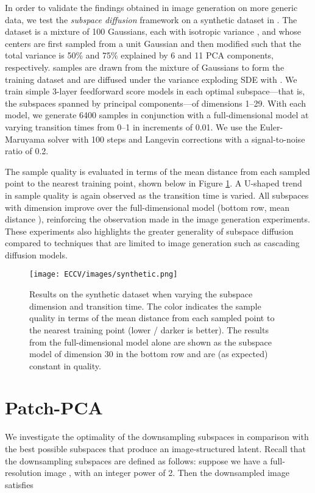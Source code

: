 \documentclass{article}
\begin{document}
In order to validate the findings obtained in image generation on more generic data, we test the \textit{subspace diffusion} framework on a synthetic dataset in . The dataset is a mixture of 100 Gaussians, each with isotropic variance , and whose centers are first sampled from a unit Gaussian and then modified such that the total variance is 50\% and 75\% explained by 6 and 11 PCA components, respectively.  samples are drawn from the mixture of Gaussians to form the training dataset and are diffused under the variance exploding SDE with . We train simple 3-layer feedforward score models in each optimal subspace---that is, the subspaces spanned by principal components---of dimensions 1--29. With each model, we generate 6400 samples in conjunction with a full-dimensional model at varying transition times from 0--1 in increments of 0.01. We use the Euler-Maruyama solver with 100 steps and Langevin corrections with a signal-to-noise ratio of 0.2.

The sample quality is evaluated in terms of the mean  distance from each sampled point to the nearest training point, shown below in Figure \ref{fig:synthetic}. A U-shaped trend in sample quality is again observed as the transition time is varied. All subspaces with dimension  improve over the full-dimensional model (bottom row, mean distance ), reinforcing the observation made in the image generation experiments. These experiments also highlights the greater generality of subspace diffusion compared to techniques that are limited to image generation such as cascading diffusion models.

\begin{figure}[h]
    \centering
    \texttt{[image: ECCV/images/synthetic.png]}
    \caption{Results on the synthetic dataset when varying the subspace dimension and transition time. The color indicates the sample quality in terms of the mean distance from each sampled point to the nearest training point (lower / darker is better). The results from the full-dimensional model alone are shown as the subspace model of dimension 30 in the bottom row and are (as expected) constant in quality.}
    \label{fig:synthetic}
\end{figure}

\section{Patch-PCA} \label{appendix:patch-pca}
We investigate the optimality of the downsampling subspaces in comparison with the best possible subspaces that produce an image-structured latent. Recall that the downsampling subspaces are defined as follows: suppose we have a full-resolution image , with  an integer power of 2. Then the downsampled image  satisfies
\end{document}
